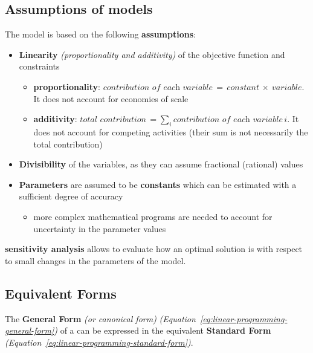 \documentclass[english]{article}
\begin{document}
\subsection{Assumptions of \LP models}

The \LP model is based on the following \textbf{assumptions}:

\begin{itemize}
  \item \textbf{Linearity} \textit{(proportionality and additivity)} of the objective function and constraints
        \begin{itemize}[label=\(\rightarrow\)]
          \item \textbf{proportionality}: \( \textit{contribution of each variable} \, = \, \textit{constant} \, \times \ \textit{variable} \). It does not account for economies of scale
          \item \textbf{additivity}: \(\textit{total contribution} \, =\sum_i \textit{contribution of each variable} \, i\). It does not account for competing activities (their sum is not necessarily the total contribution)
        \end{itemize}
  \item \textbf{Divisibility} of the variables, as they can assume fractional (rational) values
  \item \textbf{Parameters} are assumed to be \textbf{constants} which can be estimated with a sufficient degree of accuracy
        \begin{itemize}[label=\(\rightarrow\)]
          \item more complex mathematical programs are needed to account for uncertainty in the parameter values
        \end{itemize}
\end{itemize}

\LP \textbf{sensitivity analysis} allows to evaluate how  an optimal solution is with respect to small changes in the parameters of the model. %

\subsection{Equivalent Forms}

The \textbf{General Form} \textit{(or canonical form)} \textit{(Equation~\ref{eq:linear-programming-general-form})} of a \LP can be expressed in the equivalent \textbf{Standard Form} \textit{(Equation~\ref{eq:linear-programming-standard-form})}.
\end{document}
